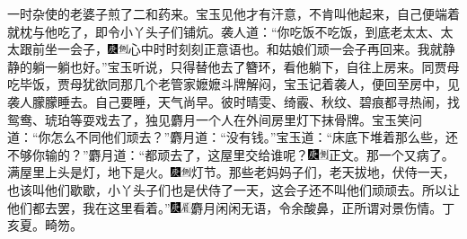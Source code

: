 一时杂使的老婆子煎了二和药来。宝玉见他才有汗意，不肯叫他起来，自己便端着就枕与他吃了，即令小丫头子们铺炕。袭人道：“你吃饭不吃饭，到底老太太、太太跟前坐一会子，{\includegraphics[width=3mm]{../Images/00004}\includegraphics[width=3mm]{../Images/00011}\footnotesize \kaishu 心中时时刻刻正意语也。}和姑娘们顽一会子再回来。我就静静的躺一躺也好。”宝玉听说，只得替他去了簪环，看他躺下，自往上房来。同贾母吃毕饭，贾母犹欲同那几个老管家嬷嬷斗牌解闷，宝玉记着袭人，便回至房中，见袭人朦朦睡去。自己要睡，天气尚早。彼时晴雯、绮霰、秋纹、碧痕都寻热闹，找鸳鸯、琥珀等耍戏去了，独见麝月一个人在外间房里灯下抹骨牌。宝玉笑问道：“你怎么不同他们顽去？”麝月道：“没有钱。”宝玉道：“床底下堆着那么些，还不够你输的？”麝月道：“都顽去了，这屋里交给谁呢？{\includegraphics[width=3mm]{../Images/00004}\includegraphics[width=3mm]{../Images/00011}\footnotesize \kaishu 正文。}那一个又病了。满屋里上头是灯，地下是火。{\includegraphics[width=3mm]{../Images/00004}\includegraphics[width=3mm]{../Images/00011}\footnotesize \kaishu 灯节。}那些老妈妈子们，老天拔地，伏侍一天，也该叫他们歇歇，小丫头子们也是伏侍了一天，这会子还不叫他们顽顽去。所以让他们都去罢，我在这里看着。”{\includegraphics[width=3mm]{../Images/00004}\includegraphics[width=3mm]{../Images/00010}\footnotesize \kaishu 麝月闲闲无语，令余酸鼻，正所谓对景伤情。丁亥夏。畸笏。}

